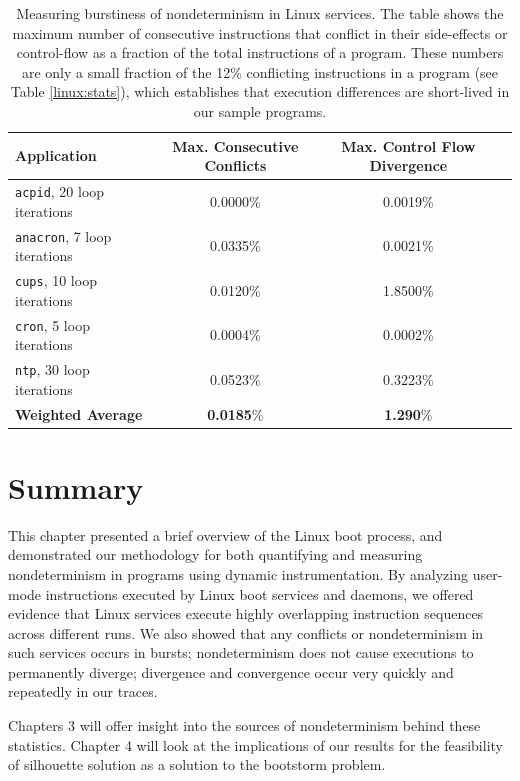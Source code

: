 \begin{table}
\begin{center}
\begin{tabular}{||l|c|c|c||}\hline
  Application & Max. Consecutive Conflicts & Max. Control Flow Divergence \\
  \hline \hline
  \texttt{acpid}, 20 loop iterations & 0.0000\% & 0.0019\% 
  \\\hline
  \texttt{anacron}, 7 loop iterations & 0.0335\% & 0.0021\% 
  \\\hline 
  \texttt{cups}, 10 loop iterations & 0.0120\% & 1.8500\% 
  \\\hline 
  \texttt{cron}, 5 loop iterations & 0.0004\% & 0.0002\% 
  \\\hline 
  \texttt{ntp}, 30 loop iterations & 0.0523\% & 0.3223\% 
  \\\hline 
  \hline 
  {\bf Weighted Average} & {\bf 0.0185}\% & {\bf 1.290}\% %
  \\\hline 
\end{tabular}
\end{center}
\caption{Measuring burstiness of nondeterminism in Linux services. \newline
The table shows the maximum number of consecutive instructions that conflict
in their side-effects or control-flow as a fraction of 
the total instructions of a program. These numbers are
only a small fraction of the 12\% conflicting
instructions in a program (see Table \ref{linux:stats}),
which establishes that execution differences are short-lived in our 
sample programs.} 
\label{burst:stats}
\end{table}


\newpage \section{Summary}
This chapter presented a brief overview of the Linux boot process,
and demonstrated our methodology for both quantifying and measuring nondeterminism
in programs using dynamic instrumentation. By analyzing user-mode
instructions executed by Linux boot services and daemons, we offered
evidence that Linux services execute highly overlapping instruction
sequences across different runs. We also showed
that any conflicts or nondeterminism in such services occurs in bursts;
nondeterminism does not cause executions to permanently diverge;
divergence and convergence occur very quickly and repeatedly in our
traces.

Chapters 3 will offer insight into the sources 
of nondeterminism behind these statistics. 
Chapter 4 will look at the implications of our results 
for the feasibility of silhouette solution as a solution to the bootstorm problem.

